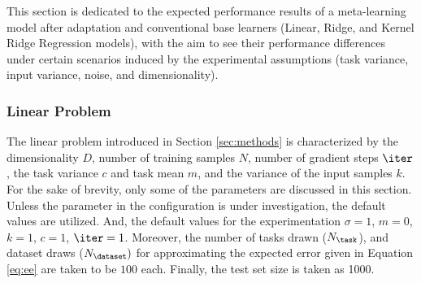 This section is dedicated to the expected performance results of a meta-learning model after adaptation and conventional base learners (\eg Linear, Ridge, and Kernel Ridge Regression models), with the aim to see their performance differences under certain scenarios induced by the experimental assumptions (\eg task variance, input variance, noise, and dimensionality). 

\subsubsection{Linear Problem}
The linear problem introduced in Section \ref{sec:methods} is characterized by the dimensionality $D$, number of training samples $N$, number of gradient steps $\iter$, the task variance $c$ and task mean $m$, and the variance of the input samples $k$. For the sake of brevity, only some of the parameters are discussed in this section. Unless the parameter in the configuration is under investigation, the default values are utilized. And, the default values for the experimentation $\sigma=1$, $m=0$, $k=1$, $c=1$, $\iter=1$.
Moreover, the number of tasks drawn ($N_{\task}$), and dataset draws ($N_{\dataset})$  for approximating the expected error given in Equation \ref{eq:ee} are taken to be $100$ each. Finally, the test set size is taken as 1000.


